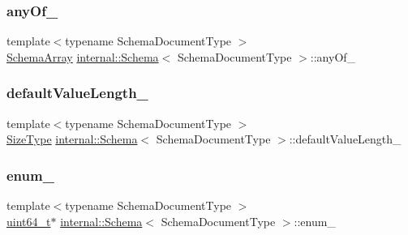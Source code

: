\mbox{\label{classinternal_1_1Schema_affddbc7b95ae4af1731068816aece735}} 
\subsubsection{\texorpdfstring{any\+Of\+\_\+}{anyOf\_}}
{\footnotesize\ttfamily template$<$typename Schema\+Document\+Type $>$ \\
\hyperlink{structinternal_1_1Schema_1_1SchemaArray}{Schema\+Array} \hyperlink{classinternal_1_1Schema}{internal\+::\+Schema}$<$ Schema\+Document\+Type $>$\+::any\+Of\+\_\+\hspace{0.3cm}{\ttfamily [private]}}

\mbox{\label{classinternal_1_1Schema_a81be31a924b213b0d3a74aa9483f7fb1}} 
\subsubsection{\texorpdfstring{default\+Value\+Length\+\_\+}{defaultValueLength\_}}
{\footnotesize\ttfamily template$<$typename Schema\+Document\+Type $>$ \\
\hyperlink{rapidjson_8h_a5ed6e6e67250fadbd041127e6386dcb5}{Size\+Type} \hyperlink{classinternal_1_1Schema}{internal\+::\+Schema}$<$ Schema\+Document\+Type $>$\+::default\+Value\+Length\+\_\+\hspace{0.3cm}{\ttfamily [private]}}

\mbox{\label{classinternal_1_1Schema_ae989bb191c95a0b50743316a7548cffc}} 
\subsubsection{\texorpdfstring{enum\+\_\+}{enum\_}}
{\footnotesize\ttfamily template$<$typename Schema\+Document\+Type $>$ \\
\hyperlink{stdint_8h_aec6fcb673ff035718c238c8c9d544c47}{uint64\+\_\+t}$\ast$ \hyperlink{classinternal_1_1Schema}{internal\+::\+Schema}$<$ Schema\+Document\+Type $>$\+::enum\+\_\+\hspace{0.3cm}{\ttfamily [private]}}

